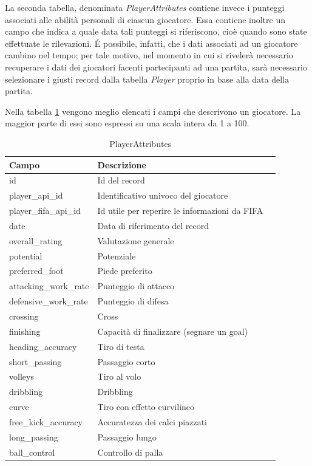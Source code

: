 \documentclass[hidelinks, 12pt]{article}
\begin{document}
La seconda tabella, denominata {\it PlayerAttributes} contiene invece i punteggi associati alle abilità personali di ciascun giocatore. Essa contiene inoltre un campo che indica a quale data tali punteggi si riferiscono, cioè quando sono state effettuate le rilevazioni. É possibile, infatti, che i dati associati ad un giocatore cambino nel tempo; per tale motivo, nel momento in cui si rivelerà necessario recuperare i dati dei giocatori facenti partecipanti ad una partita, sarà necessario selezionare i giusti record dalla tabella \textit{Player} proprio in base alla data della partita.

Nella tabella \ref{tab:player_attr} vengono meglio elencati i campi che descrivono un giocatore. La maggior parte di essi sono espressi su una scala intera da 1 a 100.

\begin{table}[H]
	\caption{PlayerAttributes}\label{tab:player_attr}
	\centering
	\begin{tabular}{|l|l|l|}
		\hline
		Campo & Descrizione \\
		\hline
		id & Id del record \\
		player\_api\_id & Identificativo univoco del giocatore \\
		player\_fifa\_api\_id & Id utile per reperire le informazioni da FIFA \\
		date & Data di riferimento del record \\
		overall\_rating & Valutazione generale \\
		potential & Potenziale \\
		preferred\_foot & Piede preferito \\
		attacking\_work\_rate & Punteggio di attacco \\
		defensive\_work\_rate & Punteggio di difesa \\
		crossing & Cross \\
		finishing & Capacità di finalizzare (segnare un goal) \\
		heading\_accuracy & Tiro di testa \\
		short\_passing & Passaggio corto \\
		volleys & Tiro al volo \\
		dribbling & Dribbling \\
		curve & Tiro con effetto curvilineo \\
		free\_kick\_accuracy & Accuratezza dei calci piazzati \\
		long\_passing & Passaggio lungo \\
		ball\_control & Controllo di palla \\

\end{tabular}
\end{table}
\end{document}
